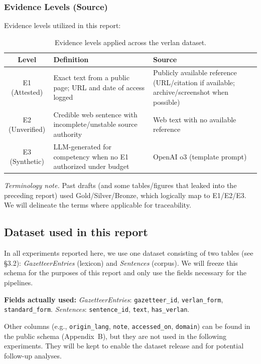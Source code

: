 \documentclass[12pt]{article}
\begin{document}
\subsubsection{Evidence Levels (Source)}

Evidence levels utilized in this report:

\begin{table}[H]
\centering
\caption{Evidence levels applied across the verlan dataset.}
\begin{tabular}{c|l|l}
\hline
\textbf{Level} & \textbf{Definition} & \textbf{Source} \\
\hline
E1 (Attested)   & Exact text from a public page; URL and date of access logged & Publicly available reference (URL/citation if available; archive/screenshot when possible) \\
E2 (Unverified) & Credible web sentence with incomplete/unstable source authority & Web text with no available reference \\
E3 (Synthetic)  & LLM-generated for competency when no E1 authorized under budget & OpenAI o3 (template prompt) \\
\hline
\end{tabular}
\label{tab:verlan_tiers}
\end{table}

\noindent \textit{Terminology note.} Past drafts (and some tables/figures that leaked into the preceding report) used Gold/Silver/Bronze, which logically map to E1/E2/E3. We will delineate the terms where applicable for traceability.



\subsection{Dataset used in this report}

In all experiments reported here, we use one dataset consisting of two tables (see §3.2): \textit{GazetteerEntries} (lexicon) and \textit{Sentences} (corpus). We will freeze this schema for the purposes of this report and only use the fields necessary for the pipelines.

\textbf{Fields actually used:} \textit{GazetteerEntries}: \texttt{gazetteer\_id}, \texttt{verlan\_form}, \texttt{standard\_form}. \; \textit{Sentences}: \texttt{sentence\_id}, \texttt{text}, \texttt{has\_verlan}.

Other columns (e.g., \texttt{origin\_lang}, \texttt{note}, \texttt{accessed\_on}, \texttt{domain}) can be found in the public schema (Appendix~B), but they are not used in the following experiments. They will be kept to enable the dataset release and for potential follow-up analyses.
\end{document}
